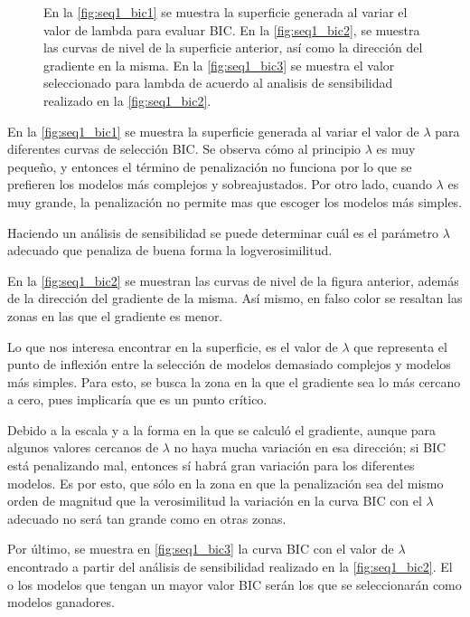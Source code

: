 \begin{figure}[t!]
{\begin{subfigure}[b]{0.55\textwidth}
    \caption{}
    \label{fig:seq1_bic3}
  \end{subfigure}
  }
  \caption[Secuencia 1: Pruebas BIC]{En la \autoref{fig:seq1_bic1} se muestra la superficie generada al variar el valor de lambda para evaluar BIC. En la \autoref{fig:seq1_bic2}, se muestra las curvas de nivel de la superficie anterior, así como la dirección del gradiente en la misma. En la \autoref{fig:seq1_bic3} se muestra el valor seleccionado para lambda de acuerdo al analisis de sensibilidad realizado en la \autoref{fig:seq1_bic2}.}
  \label{fig:seq1_bic}
\end{figure}

En la \autoref{fig:seq1_bic1} se muestra la superficie generada al variar el valor de $\lambda$ para diferentes curvas de selección BIC. Se observa cómo al principio $\lambda$ es muy pequeño, y entonces el término de penalización no funciona por lo que se prefieren los modelos más complejos y sobreajustados. Por otro lado, cuando $\lambda$ es muy grande, la penalización no permite mas que escoger los modelos más simples.

Haciendo un análisis de sensibilidad se puede determinar cuál es el parámetro $\lambda$ adecuado que penaliza de buena forma la logverosimilitud.

En la \autoref{fig:seq1_bic2} se muestran las curvas de nivel de la figura anterior, además de la dirección del gradiente de la misma. Así mismo, en falso color se resaltan las zonas en las que el gradiente es menor. 

Lo que nos interesa encontrar en la superficie, es el valor de $\lambda$ que representa el punto de inflexión entre la selección de modelos demasiado complejos y modelos más simples. Para esto, se busca la zona en la que el gradiente sea lo más cercano a cero, pues implicaría que es un punto crítico.

Debido a la escala y a la forma en la que se calculó el gradiente, aunque para algunos valores cercanos de $\lambda$ no haya mucha variación en esa dirección; si BIC está penalizando mal, entonces sí habrá gran variación para los diferentes modelos. Es por esto, que sólo en la zona en que la penalización sea del mismo orden de magnitud que la verosimilitud la variación en la curva BIC con el $\lambda$ adecuado no será tan grande como en otras zonas.

Por último, se muestra en \autoref{fig:seq1_bic3} la curva BIC con el valor de $\lambda$ encontrado a partir del análisis de sensibilidad realizado en la \autoref{fig:seq1_bic2}. El o los modelos que tengan un mayor valor BIC serán los que se seleccionarán como modelos ganadores.

